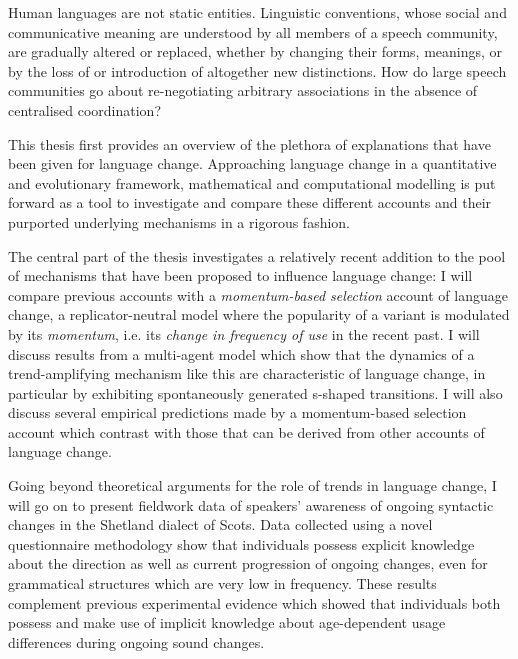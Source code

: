Human languages are not static entities. Linguistic conventions, whose social and communicative meaning are understood by all members of a speech community, are gradually altered or replaced, whether by changing their forms, meanings, or by the loss of or introduction of altogether new distinctions. How do large speech communities go about re-negotiating arbitrary associations in the absence of centralised coordination?

This thesis first provides an overview of the plethora of explanations that have been given for language change. %
Approaching language change in a quantitative and evolutionary framework, mathematical and computational modelling is put forward as a tool to investigate and compare these different accounts and their purported underlying mechanisms in a rigorous fashion.

The central part of the thesis investigates a relatively recent addition to the pool of mechanisms that have been proposed to influence language change: I will compare previous accounts with a \emph{momentum-based selection} account of language change, a replicator-neutral model where the popularity of a variant is modulated by its \emph{momentum}, i.e. its \emph{change in frequency of use} in the recent past. I will discuss results from a multi-agent model which show that the dynamics of a trend-amplifying mechanism like this are characteristic of language change, in particular by exhibiting spontaneously generated s-shaped transitions. I will also discuss several empirical predictions made by a momentum-based selection account which contrast with those that can be derived from other accounts of language change.

Going beyond theoretical arguments for the role of trends in language change, I will go on to present fieldwork data of speakers' awareness of ongoing syntactic changes in the Shetland dialect of Scots. Data collected using a novel questionnaire methodology show that individuals possess explicit knowledge about the direction as well as current progression of ongoing changes, even for grammatical structures which are very low in frequency. These results complement previous experimental evidence which showed that individuals both possess and make use of implicit knowledge about age-dependent usage differences during ongoing sound changes.%

